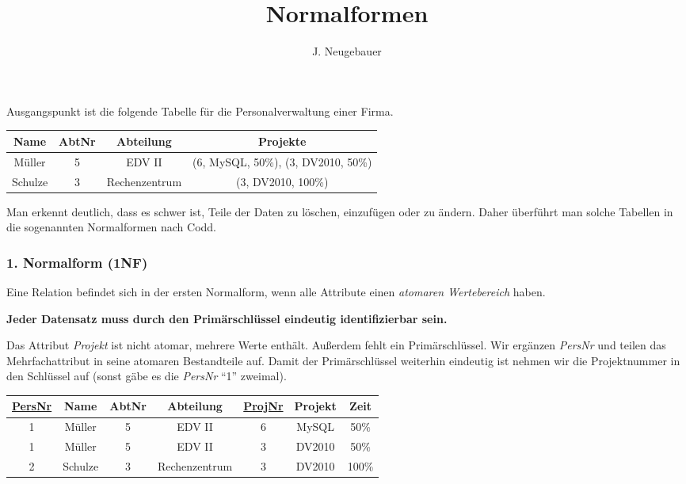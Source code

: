 \documentclass[9pt, a4paper]{scrartcl}
\author{J. Neugebauer}
\title{Normalformen}
\date{\Heute}
\begin{document}
\ReiheTitel

Ausgangspunkt ist die folgende Tabelle für die Personalverwaltung einer Firma.

\begin{center}
\begin{tabular}{|c|c|c|c|}\hline
	\rowcolor{ngb.tabelle.kopf.hg} Name & AbtNr & Abteilung & Projekte \\\hline
	Müller & 5 & EDV II & (6, MySQL, 50\%), (3, DV2010, 50\%) \\\hline
	Schulze & 3 & Rechenzentrum & (3, DV2010, 100\%) \\\hline
\end{tabular}
\end{center}

Man erkennt deutlich, dass es schwer ist, Teile der Daten zu löschen, einzufügen oder zu ändern. Daher überführt man solche Tabellen in die sogenannten Normalformen nach Codd.

\begin{infobox}
	\subsubsection*{1. Normalform (1NF)}
	
	Eine Relation befindet sich in der ersten Normalform, wenn alle Attribute einen 
	\emph{atomaren Wertebereich} haben.
	
	\textbf{Jeder Datensatz muss durch den Primärschlüssel eindeutig identifizierbar sein.}
\end{infobox}

Das Attribut \emph{Projekt} ist nicht atomar, mehrere Werte enthält. Außerdem fehlt ein Primärschlüssel. Wir ergänzen \emph{PersNr} und teilen das Mehrfachattribut in seine atomaren Bestandteile auf. Damit der Primärschlüssel weiterhin
eindeutig ist nehmen wir die Projektnummer in den Schlüssel auf (sonst gäbe es die \emph{PersNr} \enquote{1} zweimal).

\begin{center}
\begin{tabular}{|c|c|c|c|c|c|c|}\hline
	\rowcolor{ngb.tabelle.kopf.hg} \underline{PersNr} & Name & AbtNr & Abteilung & \underline{ProjNr} & Projekt & Zeit \\\hline
	1 & Müller & 5 & EDV II & 6 & MySQL & 50\% \\\hline
	1 & Müller & 5 & EDV II & 3 & DV2010 & 50\% \\\hline
	2 & Schulze & 3 & Rechenzentrum & 3 & DV2010 & 100\% \\\hline
\end{tabular}
\end{center}
\end{document}
